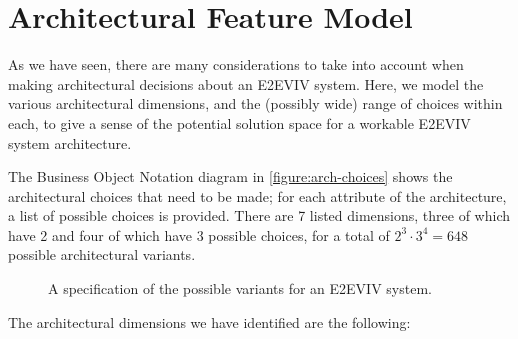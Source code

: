 \section{Architectural Feature Model}

As we have seen, there are many considerations to take into account
when making architectural decisions about an E2EVIV system. Here, we
model the various architectural dimensions, and the (possibly wide)
range of choices within each, to give a sense of the potential
solution space for a workable E2EVIV system architecture.

The Business Object Notation diagram in \autoref{figure:arch-choices}
shows the architectural choices that need to be made; for each
attribute of the architecture, a list of possible choices is
provided. There are 7 listed dimensions, three of which have 2 and
four of which have 3 possible choices, for a total of
$2^3\cdot{}3^4=648$ possible architectural variants.

\begin{figure}[t]
\begin{center}

\end{center}
\caption{A specification of the possible variants for an E2EVIV system.}
\label{figure:arch-choices}
\end{figure}

The architectural dimensions we have identified are the following:

